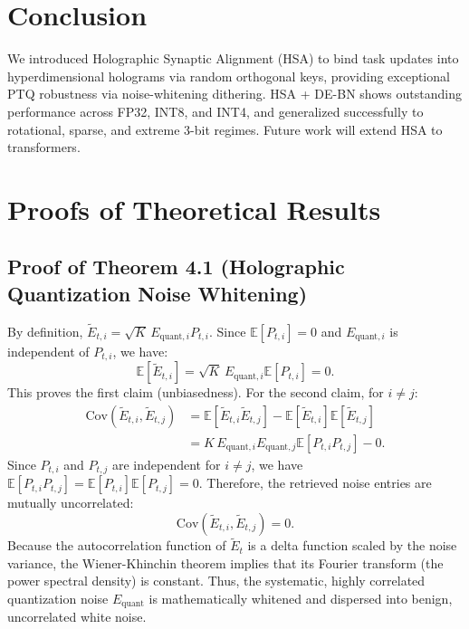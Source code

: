 \documentclass{article}
\theoremstyle{plain}
\theoremstyle{definition}
\theoremstyle{remark}
\begin{document}
\section{Conclusion}
We introduced Holographic Synaptic Alignment (HSA) to bind task updates into hyperdimensional holograms via random orthogonal keys, providing exceptional PTQ robustness via noise-whitening dithering. HSA + DE-BN shows outstanding performance across FP32, INT8, and INT4, and generalized successfully to rotational, sparse, and extreme 3-bit regimes. Future work will extend HSA to transformers.




\clearpage
\appendix
\onecolumn
\section{Proofs of Theoretical Results}

\subsection{Proof of Theorem 4.1 (Holographic Quantization Noise Whitening)}
\label{proof:whitening}
By definition, $\tilde{E}_{t,i} = \sqrt{K} \, E_{\text{quant},i} P_{t,i}$.
Since $\mathbb{E}[P_{t,i}] = 0$ and $E_{\text{quant},i}$ is independent of $P_{t,i}$, we have:
\begin{equation}
    \mathbb{E}[\tilde{E}_{t,i}] = \sqrt{K} \, E_{\text{quant},i} \mathbb{E}[P_{t,i}] = 0.
\end{equation}
This proves the first claim (unbiasedness).
For the second claim, for $i \neq j$:
\begin{align}
    \text{Cov}(\tilde{E}_{t,i}, \tilde{E}_{t,j}) &= \mathbb{E}[\tilde{E}_{t,i} \tilde{E}_{t,j}] - \mathbb{E}[\tilde{E}_{t,i}]\mathbb{E}[\tilde{E}_{t,j}] \nonumber \\
    &= K \, E_{\text{quant},i} E_{\text{quant},j} \mathbb{E}[P_{t,i} P_{t,j}] - 0.
\end{align}
Since $P_{t,i}$ and $P_{t,j}$ are independent for $i \neq j$, we have $\mathbb{E}[P_{t,i} P_{t,j}] = \mathbb{E}[P_{t,i}] \mathbb{E}[P_{t,j}] = 0$. Therefore, the retrieved noise entries are mutually uncorrelated:
\begin{equation}
    \text{Cov}(\tilde{E}_{t,i}, \tilde{E}_{t,j}) = 0.
\end{equation}
Because the autocorrelation function of $\tilde{E}_t$ is a delta function scaled by the noise variance, the Wiener-Khinchin theorem implies that its Fourier transform (the power spectral density) is constant. Thus, the systematic, highly correlated quantization noise $E_\text{quant}$ is mathematically whitened and dispersed into benign, uncorrelated white noise.
\end{document}
